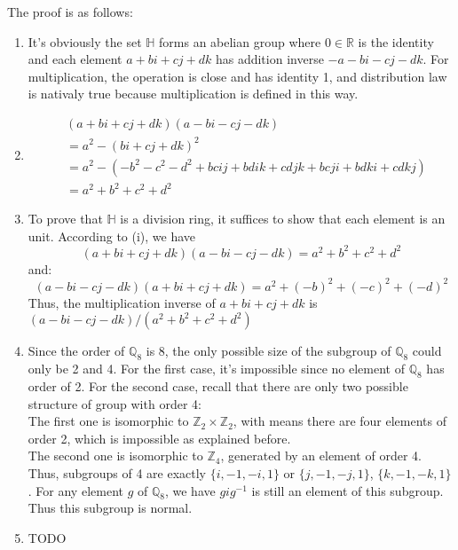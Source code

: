 \documentclass[a4paper, pdf, 12pt]{article}
\makeatletter
\renewenvironment{proof}[1][\proofname]{\par
  \pushQED{\qed}%
  \normalfont \topsep6\p@\@plus6\p@\relax
  \trivlist
  \item[%
    \hskip\labelsep
    \normalfont\bfseries %
    #1%
    \@addpunct{.}%
  ]\ignorespaces
}{%
  \popQED\endtrivlist\@endpefalse
}
\let\qed\relax %
\DeclareRobustCommand{\qed}{%
  \ifmmode \mathqed
  \else
    \leavevmode\unskip\penalty\@M\hbox{}\nobreak\hspace{.5em minus .1em}%
    \hbox{\qedsymbol}%
  \fi
}
\makeatother
\begin{document}
\begin{proof}
  The proof is as follows:
  \begin{enumerate} [leftmargin=0cm,itemindent=.2cm,labelwidth=\itemindent,labelsep=0.2cm,align=right,label=(\roman*)]
    \item It's obviously the set $\mathbb{H}$ forms an abelian group where $0\in \mathbb{R}$ is the identity and each element 
    $a+bi+cj+dk$ has addition inverse $-a-bi-cj-dk$. For multiplication, the operation is close and has identity 1, 
    and distribution law is nativaly true because multiplication is defined in this way.

    \item 
    $$
    \begin{aligned}
      &(a + bi + cj + dk)(a -bi-cj-dk) \\
      &= a^2 - (bi + cj + dk)^2 \\
      & = a^2 - (-b^2-c^2-d^2 + bcij + bdik 
       + cdjk + bcji + bdki + cdkj)\\
      & = a^2+b^2+c^2+d^2
    \end{aligned}
    $$

    \item 
    To prove that $\mathbb{H}$ is a division ring, it suffices to show that each 
    element is an unit.
    According to (i), we have 
    $$(a + bi + cj + dk)(a-bi-cj-dk) = a^2 + b^2+c^2+d^2$$
    and:
    $$(a - bi - cj -dk)(a+bi+cj+dk) = a^2 + (-b)^2 + (-c)^2 + (-d)^2$$
    Thus, the multiplication inverse of $a + bi+cj+dk$ is $(a-bi-cj-dk) / (a^2 + b^2+c^2+d^2)$

    \item 
    Since the order of $\mathbb{Q}_{8}$ is 8, the only possible size of the subgroup of 
    $\mathbb{Q}_{8}$ could only be 2 and 4. For the first case, it's impossible since no element 
    of $\mathbb{Q}_{8}$ has order of 2. For the second case, recall that there are only two possible 
    structure of group with order 4: \\
    The first one is isomorphic to $\mathbb{Z}_{2}\times \mathbb{Z}_{2}$, 
    with means there are four elements of order 2, which is impossible as explained before.\\
    The second one is isomorphic to $\mathbb{Z}_{4}$, generated by an element of order 4. Thus, subgroups 
    of 4 are exactly $\{i, -1, -i, 1\}$ or $\{j, -1, -j, 1\}$, $\{k, -1, -k, 1\}$. For any element $g$ of 
    $\mathbb{Q}_{8}$, we have $gig^{-1}$ is still an element of this subgroup. Thus this
    subgroup is normal.

    \item TODO
  \end{enumerate}
\end{proof}
\end{document}

